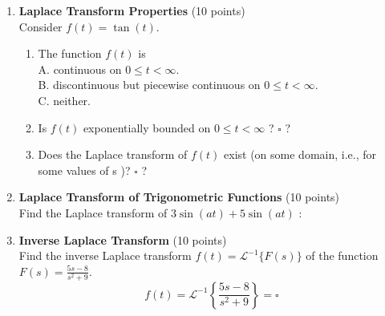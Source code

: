 \begin{enumerate}
  \item \textbf{Laplace Transform Properties} (10 points)\\
  Consider $f(t)=\tan (t)$.
  \begin{enumerate}[label=(\alph*)]
    \item The function $f(t)$ is\\
    A. continuous on $0 \leq t<\infty$.\\
    B. discontinuous but piecewise continuous on $0 \leq t<\infty$.\\
    C. neither.\\
    \begin{subanswer}
    \end{subanswer}
    \item Is $f(t)$ exponentially bounded on $0 \leq t<\infty$ ? $\square$ ?\\
    \begin{subanswer}
    \end{subanswer}
    \item Does the Laplace transform of $f(t)$ exist (on some domain, i.e., for some values of s )? $\square$ ?\\
    \begin{subanswer}
    \end{subanswer}
  \end{enumerate}

  \item \textbf{Laplace Transform of Trigonometric Functions} (10 points)\\
  Find the Laplace transform of $3 \sin (a t)+5 \sin (a t)$ :\\
  \begin{subanswer}
  \end{subanswer}

  \newpage

  \item \textbf{Inverse Laplace Transform} (10 points)\\
  Find the inverse Laplace transform $f(t)=\mathcal{L}^{-1}\{F(s)\}$ of the function $F(s)=\frac{5 s-8}{s^2+9}$.
  $$
  f(t)=\mathcal{L}^{-1}\left\{\frac{5 s-8}{s^2+9}\right\}=\square
  $$
  \begin{subanswer}
  \end{subanswer}


\end{enumerate}
